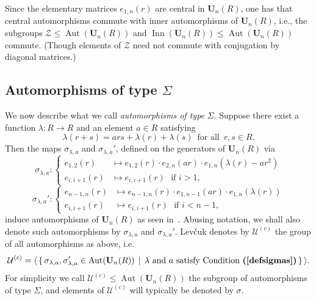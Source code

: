 \documentclass[a4paper,11pt]{amsart}
\numberwithin{equation}{section}
\theoremstyle{plain}
\theoremstyle{definition}
\newenvironment{rmk}
  {\pushQED{\qed}\renewcommand{\qedsymbol}{$\triangle$}\rmkx}
  {\popQED\endrmkx}
\newcommand{\ekl}[1]{e_{#1}} %
\newcommand{\mbU}{\mathbf{U}} %
\newcommand{\gera}[1]{\langle {#1} \rangle}
\newcommand{\set}[1]{\{ #1 \}}
\newcommand{\mc}{\mathcal}
\newcommand{\bref}[1]{{\bf(\ref{#1})}} %
\DeclareMathOperator{\Aut}{Aut}
\DeclareMathOperator{\Inn}{Inn}
\begin{document}
\begin{rmk} \label{obs:centralautomorphisms}
Since the elementary matrices $\ekl{1,n}(r)$ are central in $\mbU_n(R)$, one has that central automorphisms commute with inner automorphisms of $\mbU_n(R)$, i.e., the subgroups $\mc{Z} \leq \Aut(\mbU_n(R))$ and $\Inn(\mbU_n(R)) \leq \Aut(\mbU_n(R))$ commute. (Though elements of $\mc{Z}$ need not commute with conjugation by diagonal matrices.) 
\end{rmk}

\subsection{Automorphisms of type $\Sigma$}\label{Levchuk:sigma}
We now describe what we call \emph{automorphisms of type} $\Sigma$. Suppose there exist a function $\lambda: R \to R$ and an element $a \in R$ satisfying
\begin{equation} \label{defsigmas} \lambda(r+s) = ars + \lambda(r) + \lambda(s) \, \text{ for all } \, r,s \in R. \end{equation}
Then the maps $\sigma_{\lambda,a}$ and $\sigma_{\lambda,a}'$, defined on the generators of $\mbU_n(R)$ via
\[ \sigma_{\lambda,a} : \begin{cases} e_{1,2}(r) & \mapsto e_{1,2}(r) \cdot e_{2,n}(ar) \cdot e_{1,n}(\lambda(r) - ar^2) \\ e_{i,i+1}(r) & \mapsto e_{i,i+1}(r) \, \, \text{ if } i > 1, \end{cases} \]
\[ \sigma_{\lambda,a}' : \begin{cases} e_{n-1,n}(r) & \mapsto e_{n-1,n}(r) \cdot e_{1,n-1}(ar) \cdot e_{1,n}(\lambda(r)) \\ e_{i,i+1}(r) & \mapsto e_{i,i+1}(r) \, \, \text{ if } i < n-1, \end{cases} \]
induce automorphisms of $\mbU_n(R)$ as seen in~\cite[66]{LevchukOriginal}. Abusing notation, we shall also denote such automorphisms by $\sigma_{\lambda,a}$ and $\sigma_{\lambda,a}'$. Lev\v{c}uk denotes by $\mc{U}^{(c)}$ the group of all automorphisms as above, i.e. 
\[ \mc{U}^{(c)} = \gera{ \, \set{ \,\sigma_{\lambda,a}, \sigma_{\lambda,a}' \in \Aut(\mbU_n(R)) \, \mid \, \lambda \text{ and } a \text{ satisfy Condition~\bref{defsigmas}} \, } \, }. \]
For simplicity we call $\mc{U}^{(c)} \leq \Aut(\mbU_n(R))$ the subgroup of automorphisms of type $\Sigma$, and elements of $\mc{U}^{(c)}$ will typically be denoted by $\sigma$.
\end{document}
